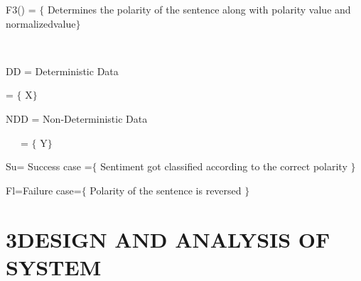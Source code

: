 \documentclass[12pt]{article}
\begin{document}
\textcolor[HTML]{00000A}{F3() = $ \{ $ Determines the polarity of the sentence along with polarity value and normalized\tab  value$ \} $ }\par

\textcolor[HTML]{00000A}{\ \ \ \ \ \ \ \ \ \ \ \ \ \ \ \ \ \ \ \ \ \ \ \ \ \ \ \ \ \ \ \ \ \ \ \ \ \ \ \ \ \ \ \ \ \ \ \ \ \ \ \ \ \ \ \ \ \ \ \ \ \ \ \ \  \tab }\par

\textcolor[HTML]{00000A}{DD = Deterministic Data}\par

\textcolor[HTML]{00000A}{ \tab  = $ \{ $ X$ \} $ }\par

\textcolor[HTML]{00000A}{NDD = Non-Deterministic Data}\par

\textcolor[HTML]{00000A}{ \tab \ \ \  = $ \{ $ Y$ \} $ }\par

\textcolor[HTML]{00000A}{Su= Success case =$ \{ $  Sentiment got classified according to the correct polarity $ \} $ }\par

\textcolor[HTML]{00000A}{Fl=Failure case=$ \{ $  Polarity of the sentence is reversed $ \} $ }\par

\begin{justify}
{\fontsize{15pt}{18.0pt}\selectfont \textbf{ }\par}
\end{justify}\par

\setlength{\parskip}{12.0pt}
\begin{justify}
\textbf{ }
\end{justify}\par

\section*{3\hspace*{10pt}DESIGN AND ANALYSIS OF SYSTEM}
\end{document}
